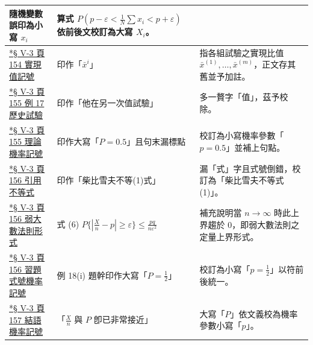 \documentclass[a4paper,12pt,twoside]{article}
\begin{document}
\begin{xltabular}{\textwidth}{|p{3.2cm}|p{3.8cm}|X|}
隨機變數誤印為小寫 $x_i$ & 
算式 $P(p-\varepsilon < \frac{1}{N}\sum x_i < p+\varepsilon)$ 依前後文校訂為大寫 $X_i$。 \\
\hline
\hyperref[note:b5s-ch5-p164-xi]{*§ V-3 頁 154 實現值記號} & 
印作「$\bar{x}^i$」 & 
指各組試驗之實現比值 $\bar{x}^{(1)}, \dots, \bar{x}^{(m)}$，正文存其舊並予加註。 \\
\hline
\hyperref[note:b5s-ch5-p165-extra]{*§ V-3 頁 155 例 17 歷史試驗} & 
印作「他在另一次值試驗」 & 
多一贅字「值」，茲予校除。 \\
\hline
\hyperref[note:b5s-ch5-p165-p]{*§ V-3 頁 155 理論機率記號} & 
印作大寫「$P = 0.5$」且句末漏標點 & 
校訂為小寫機率參數「$p = 0.5$」並補上句點。 \\
\hline
\hyperref[note:b5s-ch5-p166-ineq1]{*§ V-3 頁 156 引用不等式} & 
印作「柴比雪夫不等(1)式」 & 
漏「式」字且式號倒錯，校訂為「柴比雪夫不等式 (1)」。 \\
\hline
\hyperref[note:b5s-ch5-p166-wlln]{*§ V-3 頁 156 弱大數法則形式} & 
式 (6) $P\{|\frac{X}{n}-p| \ge \varepsilon\} \le \frac{pq}{n\varepsilon^2}$ & 
補充說明當 $n \to \infty$ 時此上界趨於 0，即弱大數法則之定量上界形式。 \\
\hline
\hyperref[note:b5s-ch5-p166-p]{*§ V-3 頁 156 習題式號機率記號} & 
例 18(i) 題幹印作大寫「$P = \frac{1}{2}$」 & 
校訂為小寫「$p = \frac{1}{2}$」以符前後統一。 \\
\hline
\hyperref[note:b5s-ch5-p167-p]{*§ V-3 頁 157 結語機率記號} & 
「$\frac{X}{n}$ 與 $P$ 卽已非常接近」 & 
大寫「$P$」依文義校為機率參數小寫「$p$」。 \\
\hline
\end{xltabular}
\clearpage
\renewcommand{\contentsname}{目\qquad 次}
\tableofcontents
\newpage

\end{document}
